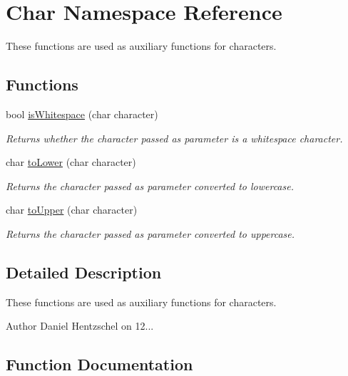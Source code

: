 \hypertarget{namespace_char}{}\section{Char Namespace Reference}
\label{namespace_char}


These functions are used as auxiliary functions for characters.  


\subsection*{Functions}
\begin{DoxyCompactItemize}
\item 
bool \mbox{\hyperlink{namespace_char_a9aac980c12e10873662a7121d5016395}{is\+Whitespace}} (char character)
\begin{DoxyCompactList}\small\item\em Returns whether the character passed as parameter is a whitespace character. \end{DoxyCompactList}\item 
char \mbox{\hyperlink{namespace_char_a5a333d969ad1891cace57ea5facce42e}{to\+Lower}} (char character)
\begin{DoxyCompactList}\small\item\em Returns the character passed as parameter converted to lowercase. \end{DoxyCompactList}\item 
char \mbox{\hyperlink{namespace_char_a0b800fb7a4523ba2c0e7e00edd42e345}{to\+Upper}} (char character)
\begin{DoxyCompactList}\small\item\em Returns the character passed as parameter converted to uppercase. \end{DoxyCompactList}\end{DoxyCompactItemize}


\subsection{Detailed Description}
These functions are used as auxiliary functions for characters. 

\begin{DoxyAuthor}{Author}
Daniel Hentzschel on 12... 
\end{DoxyAuthor}


\subsection{Function Documentation}
\mbox{\label{namespace_char_a9aac980c12e10873662a7121d5016395}} 
